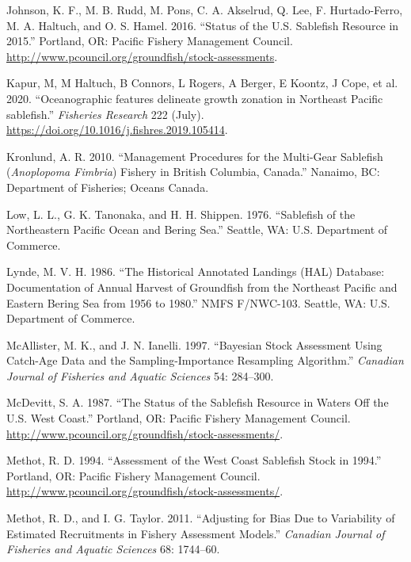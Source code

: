 \documentclass[11pt,
  english,
  a4paper,
]{article}
\newlength{\cslhangindent}
\newenvironment{cslreferences}%
  {\setlength{\parindent}{0pt}%
  \everypar{\setlength{\hangindent}{\cslhangindent}}\ignorespaces}%
  {\par}
\begin{document}
\begin{cslreferences}
\leavevmode\hypertarget{ref-johnson2016sablefish}{}%
Johnson, K. F., M. B. Rudd, M. Pons, C. A. Akselrud, Q. Lee, F. Hurtado-Ferro, M. A. Haltuch, and O. S. Hamel. 2016. ``Status of the U.S. Sablefish Resource in 2015.'' Portland, OR: Pacific Fishery Management Council. \url{http://www.pcouncil.org/groundfish/stock-assessments}.

\leavevmode\hypertarget{ref-kapur2020}{}%
Kapur, M, M Haltuch, B Connors, L Rogers, A Berger, E Koontz, J Cope, et al. 2020. ``Oceanographic features delineate growth zonation in Northeast Pacific sablefish.'' \emph{Fisheries Research} 222 (July). \url{https://doi.org/10.1016/j.fishres.2019.105414}.

\leavevmode\hypertarget{ref-kronlund2010}{}%
Kronlund, A. R. 2010. ``Management Procedures for the Multi-Gear Sablefish (\emph{\textup{Anoplopoma Fimbria}}) Fishery in British Columbia, Canada.'' Nanaimo, BC: Department of Fisheries; Oceans Canada.

\leavevmode\hypertarget{ref-low1976}{}%
Low, L. L., G. K. Tanonaka, and H. H. Shippen. 1976. ``Sablefish of the Northeastern Pacific Ocean and Bering Sea.'' Seattle, WA: U.S. Department of Commerce.

\leavevmode\hypertarget{ref-lynde1986}{}%
Lynde, M. V. H. 1986. ``The Historical Annotated Landings (HAL) Database: Documentation of Annual Harvest of Groundfish from the Northeast Pacific and Eastern Bering Sea from 1956 to 1980.'' NMFS F/NWC-103. Seattle, WA: U.S. Department of Commerce.

\leavevmode\hypertarget{ref-McAllisterIanelli1997}{}%
McAllister, M. K., and J. N. Ianelli. 1997. ``Bayesian Stock Assessment Using Catch-Age Data and the Sampling-Importance Resampling Algorithm.'' \emph{Canadian Journal of Fisheries and Aquatic Sciences} 54: 284--300.

\leavevmode\hypertarget{ref-mcdevitt1987sablefish}{}%
McDevitt, S. A. 1987. ``The Status of the Sablefish Resource in Waters Off the U.S. West Coast.'' Portland, OR: Pacific Fishery Management Council. \url{http://www.pcouncil.org/groundfish/stock-assessments/}.

\leavevmode\hypertarget{ref-methot1994}{}%
Methot, R. D. 1994. ``Assessment of the West Coast Sablefish Stock in 1994.'' Portland, OR: Pacific Fishery Management Council. \url{http://www.pcouncil.org/groundfish/stock-assessments/}.

\leavevmode\hypertarget{ref-MethotTaylor2011}{}%
Methot, R. D., and I. G. Taylor. 2011. ``Adjusting for Bias Due to Variability of Estimated Recruitments in Fishery Assessment Models.'' \emph{Canadian Journal of Fisheries and Aquatic Sciences} 68: 1744--60.


\end{cslreferences}
\end{document}
